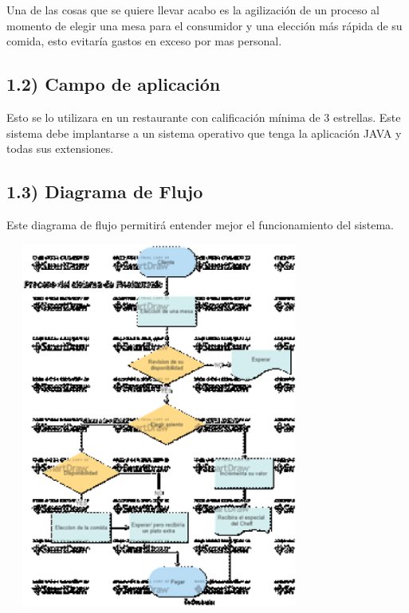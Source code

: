 \documentclass{article} %
\begin{document}
\noindent 

\noindent 

\noindent 

\noindent 

\noindent 

\noindent 

\noindent Una de las cosas que se quiere llevar acabo es la agilizaci\'{o}n de un proceso al momento de elegir    una mesa para el consumidor y una elecci\'{o}n m\'{a}s r\'{a}pida de su comida, esto evitar\'{i}a gastos en exceso por mas personal.

\noindent 

\noindent 

\noindent 

\noindent 


\subsection{ 1.2) Campo de aplicaci\'{o}n}

\noindent   Esto se lo utilizara en un restaurante con calificaci\'{o}n m\'{i}nima de 3 estrellas. Este sistema   debe implantarse a un sistema operativo que tenga la aplicaci\'{o}n JAVA y todas sus extensiones.

\noindent 


\subsection{ 1.3) Diagrama de Flujo }

\noindent Este diagrama de flujo permitir\'{a} entender mejor el funcionamiento del sistema. 

\noindent \includegraphics*[width=3.98in, height=4.74in, keepaspectratio=false]{image3}
\end{document}
